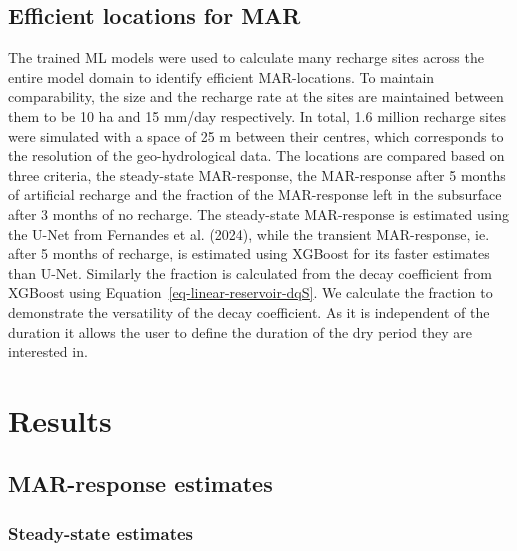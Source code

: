 \documentclass[
]{agujournal2019}
\begin{document}
\subsection{Efficient locations for
MAR}\label{efficient-locations-for-mar}

The trained ML models were used to calculate many recharge sites across
the entire model domain to identify efficient MAR-locations. To maintain
comparability, the size and the recharge rate at the sites are
maintained between them to be 10 ha and 15 mm/day respectively. In
total, 1.6 million recharge sites were simulated with a space of 25 m
between their centres, which corresponds to the resolution of the
geo-hydrological data. The locations are compared based on three
criteria, the steady-state MAR-response, the MAR-response after 5 months
of artificial recharge and the fraction of the MAR-response left in the
subsurface after 3 months of no recharge. The steady-state MAR-response
is estimated using the U-Net from Fernandes et al. (2024), while the
transient MAR-response, ie. after 5 months of recharge, is estimated
using XGBoost for its faster estimates than U-Net. Similarly the
fraction is calculated from the decay coefficient from XGBoost using
Equation~\ref{eq-linear-reservoir-dqS}. We calculate the fraction to
demonstrate the versatility of the decay coefficient. As it is
independent of the duration it allows the user to define the duration of
the dry period they are interested in.

\section{Results}\label{results}

\subsection{MAR-response estimates}\label{mar-response-estimates}

\subsubsection{Steady-state estimates}\label{steady-state-estimates}
\end{document}
